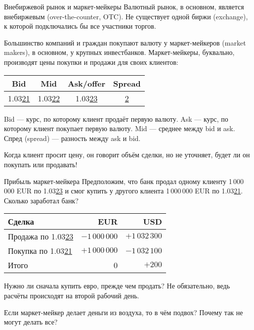 \documentclass{beamer}
\newcommand{\eurusdBigFigures}{1.03}
\newcommand{\eurusdBigFiguresPerMillion}{1\,03}
\begin{document}
\begin{frame}{Внебиржевой рынок и маркет-мейкеры}
\justify
Валютный рынок, в основном, является \alert{внебиржевым} (over-the-counter, OTC). Не 
существует одной биржи (exchange), к которой подключались бы все участники торгов.

\justify
Большинство компаний и граждан покупают валюту у маркет-мейкеров (market makers), в 
основном, у крупных инвестбанков. Маркет-мейкеры, буквально, производят цены покупки 
и продажи для своих клиентов:

\centering
\begin{tabular}{c|c|c|c}
Bid & Mid & Ask/offer & Spread \\ \hline
\eurusdBigFigures\underline{21} & \eurusdBigFigures\underline{22} & \eurusdBigFigures\underline{23} & \underline{2}
\end{tabular}

\justify
Bid --- курс, по которому клиент продаёт первую валюту. Ask --- курс, по которому клиент 
покупает первую валюту. Mid --- среднее между bid и ask. Спред (spread) --- разность между 
ask и bid.

\justify
Когда клиент просит цену, он говорит объём сделки, но не уточняет, будет ли он покупать или продавать!
\end{frame}



\begin{frame}{Прибыль маркет-мейкера}
\justify
Предположим, что банк продал одному клиенту 1\,000\,000 EUR по \eurusdBigFigures\underline{23} и
смог купить у другого клиента 1\,000\,000 EUR по \eurusdBigFigures\underline{21}. Сколько 
заработал банк?

\centering
\begin{tabular}{l|r|r}
Сделка & EUR & USD \\
\hline
Продажа по \eurusdBigFigures\underline{23} & $-1\,000\,000$ & $+\eurusdBigFiguresPerMillion2\,300$ \\
Покупка по \eurusdBigFigures\underline{21} & $+1\,000\,000$ & $-\eurusdBigFiguresPerMillion2\,100$ \\
\hline
Итого & 0 & $+200$
\end{tabular}

\justify
Нужно ли сначала купить евро, прежде чем продать? Не обязательно, ведь расчёты 
происходят на второй рабочий день.

\justify
Если маркет-мейкер делает деньги из воздуха, то в чём подвох? Почему так не могут
делать все?
\end{frame}
\end{document}
